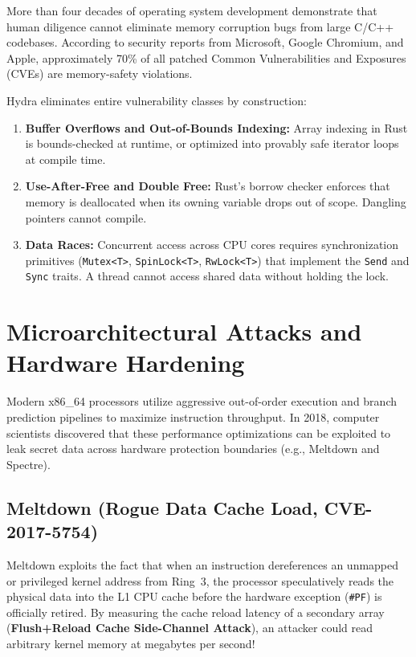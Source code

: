 More than four decades of operating system development demonstrate that human diligence cannot eliminate memory corruption bugs from large C/C++ codebases. According to security reports from Microsoft, Google Chromium, and Apple, approximately 70\% of all patched Common Vulnerabilities and Exposures (CVEs) are memory-safety violations.

Hydra eliminates entire vulnerability classes by construction:
\begin{enumerate}
    \item \textbf{Buffer Overflows and Out-of-Bounds Indexing:} Array indexing in Rust is bounds-checked at runtime, or optimized into provably safe iterator loops at compile time.
    \item \textbf{Use-After-Free and Double Free:} Rust's borrow checker enforces that memory is deallocated when its owning variable drops out of scope. Dangling pointers cannot compile.
    \item \textbf{Data Races:} Concurrent access across CPU cores requires synchronization primitives (\texttt{Mutex<T>}, \texttt{SpinLock<T>}, \texttt{RwLock<T>}) that implement the \texttt{Send} and \texttt{Sync} traits. A thread cannot access shared data without holding the lock.
\end{enumerate}

\section{Microarchitectural Attacks and Hardware Hardening}
\label{sec:hardware_mitigations}

Modern x86\_64 processors utilize aggressive out-of-order execution and branch prediction pipelines to maximize instruction throughput. In 2018, computer scientists discovered that these performance optimizations can be exploited to leak secret data across hardware protection boundaries (e.g., Meltdown and Spectre).

\subsection{Meltdown (Rogue Data Cache Load, CVE-2017-5754)}
Meltdown exploits the fact that when an instruction dereferences an unmapped or privileged kernel address from Ring~3, the processor speculatively reads the physical data into the L1 CPU cache before the hardware exception (\texttt{\#PF}) is officially retired. By measuring the cache reload latency of a secondary array (\textbf{Flush+Reload Cache Side-Channel Attack}), an attacker could read arbitrary kernel memory at megabytes per second!

